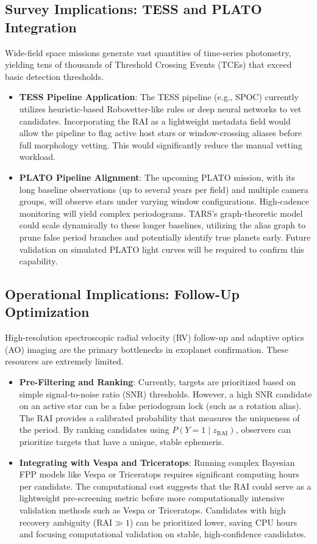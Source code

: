 \subsection{Survey Implications: TESS and PLATO Integration} \label{sec:disc_survey}
Wide-field space missions generate vast quantities of time-series photometry, yielding tens of thousands of Threshold Crossing Events (TCEs) that exceed basic detection thresholds.
\begin{itemize}
\item \textbf{TESS Pipeline Application}: The TESS pipeline (e.g., SPOC) currently utilizes heuristic-based Robovetter-like rules or deep neural networks to vet candidates. Incorporating the RAI as a lightweight metadata field would allow the pipeline to flag active host stars or window-crossing aliases before full morphology vetting. This would significantly reduce the manual vetting workload.
\item \textbf{PLATO Pipeline Alignment}: The upcoming PLATO mission, with its long baseline observations (up to several years per field) and multiple camera groups, will observe stars under varying window configurations. High-cadence monitoring will yield complex periodograms. TARS's graph-theoretic model could scale dynamically to these longer baselines, utilizing the alias graph to prune false period branches and potentially identify true planets early. Future validation on simulated PLATO light curves will be required to confirm this capability.
\end{itemize}

\subsection{Operational Implications: Follow-Up Optimization} \label{sec:disc_operational}
High-resolution spectroscopic radial velocity (RV) follow-up and adaptive optics (AO) imaging are the primary bottlenecks in exoplanet confirmation. These resources are extremely limited.
\begin{itemize}
\item \textbf{Pre-Filtering and Ranking}: Currently, targets are prioritized based on simple signal-to-noise ratio (SNR) thresholds. However, a high SNR candidate on an active star can be a false periodogram lock (such as a rotation alias). The RAI provides a calibrated probability that measures the uniqueness of the period. By ranking candidates using $P(Y=1 \mid z_{\text{RAI}})$, observers can prioritize targets that have a unique, stable ephemeris.
\item \textbf{Integrating with Vespa and Triceratops}: Running complex Bayesian FPP models like Vespa or Triceratops requires significant computing hours per candidate. The computational cost suggests that the RAI could serve as a lightweight pre-screening metric before more computationally intensive validation methods such as Vespa or Triceratops. Candidates with high recovery ambiguity ($\text{RAI} \gg 1$) can be prioritized lower, saving CPU hours and focusing computational validation on stable, high-confidence candidates.
\end{itemize}

